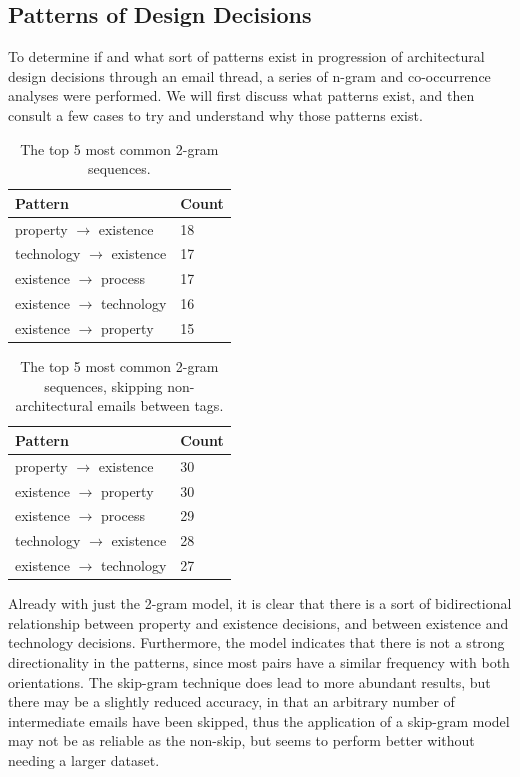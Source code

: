\documentclass[a4paper, 12pt]{article}
\begin{document}
	\subsection{Patterns of Design Decisions}
		To determine if and what sort of patterns exist in progression of architectural design decisions through an email thread, a series of n-gram and co-occurrence analyses were performed. We will first discuss what patterns exist, and then consult a few cases to try and understand why those patterns exist.
		
		\begin{table}[H]
			\centering
			\caption{The top 5 most common 2-gram sequences.}
			\begin{tabular}{|l|l|}
				\hline
				\textbf{Pattern} & \textbf{Count} \\ \hline
				property $ \rightarrow $ existence & 18 \\ \hline
				technology $ \rightarrow $ existence & 17 \\ \hline
				existence $ \rightarrow $ process & 17 \\ \hline
				existence $ \rightarrow $ technology & 16 \\ \hline
				existence $ \rightarrow $ property & 15 \\ \hline
			\end{tabular}
		\end{table}
		
		\begin{table}[H]
			\centering
			\caption{The top 5 most common 2-gram sequences, skipping non-architectural emails between tags.}
			\begin{tabular}{|l|l|}
				\hline
				\textbf{Pattern} & \textbf{Count} \\ \hline
				property $ \rightarrow $ existence & 30 \\ \hline
				existence $ \rightarrow $ property & 30 \\ \hline
				existence $ \rightarrow $ process & 29 \\ \hline
				technology $ \rightarrow $ existence & 28 \\ \hline
				existence $ \rightarrow $ technology & 27 \\ \hline
			\end{tabular}
		\end{table}
	
		Already with just the 2-gram model, it is clear that there is a sort of bidirectional relationship between property and existence decisions, and between existence and technology decisions. Furthermore, the model indicates that there is not a strong directionality in the patterns, since most pairs have a similar frequency with both orientations. The skip-gram technique does lead to more abundant results, but there may be a slightly reduced accuracy\autocite{guthrie}, in that an arbitrary number of intermediate emails have been skipped, thus the application of a skip-gram model may not be as reliable as the non-skip, but seems to perform better without needing a larger dataset.
	
\end{document}
